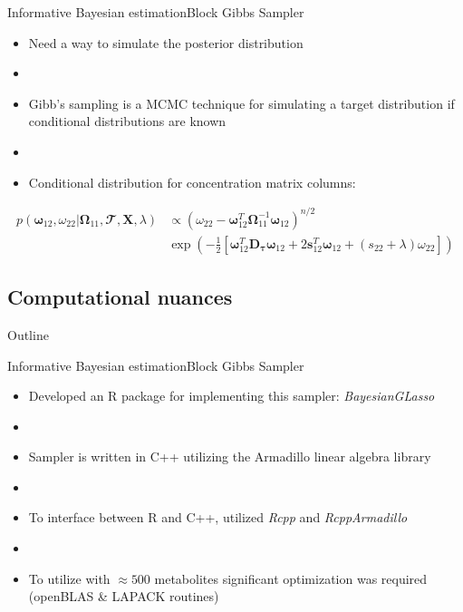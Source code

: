 \documentclass[xcolor=dvipsnames]{beamer}
\begin{document}
\begin{frame}{Informative Bayesian estimation}{Block Gibbs Sampler}
	\vspace{-10.5pt}
	\begin{itemize}
		\item Need a way to simulate the posterior distribution \pause
		\item[]
		\item Gibb's sampling is a MCMC technique for simulating a target distribution if conditional distributions are known \pause
		\item[]
		\item Conditional distribution for concentration matrix columns:
	\end{itemize}
	\begin{align*}
	p(\boldsymbol{\omega}_{12}, \omega_{22}|\boldsymbol{\Omega}_{11},\mathbfcal{T},\textbf{X},\lambda) & \propto \left(\omega_{22}-\boldsymbol{\omega}_{12}^T \boldsymbol{\Omega}_{11}^{-1}\boldsymbol{\omega}_{12} \right)^{n/2} \\ &\exp \left( - \frac{1}{2}\left[ \boldsymbol{\omega}_{12}^T \textbf{D}_{\boldsymbol{\tau}} \boldsymbol{\omega}_{12}+ 2 
	\textbf{s}_{12}^T \boldsymbol{\omega}_{12} + (s_{22}+\lambda)\omega_{22}\right] \right)
	\end{align*}
\end{frame}

\subsection{Computational nuances}
\begin{frame}{Outline}
	\vspace{-10.5pt}
	\tableofcontents[currentsection,subsectionstyle=show/shaded/hide]
\end{frame}
\begin{frame}{Informative Bayesian estimation}{Block Gibbs Sampler}
	\vspace{-15.5pt}
	\begin{itemize}
		\item Developed an R package for implementing this sampler: \emph{BayesianGLasso} \pause
		\item[]
		\item Sampler is written in C++ utilizing the Armadillo linear algebra library \pause
		\item[]
		\item To interface between R and C++, utilized \emph{Rcpp} and \emph{RcppArmadillo} \pause
		\item[]
		\item To utilize with $\approx 500$ metabolites significant optimization was required (openBLAS \& LAPACK routines)
	\end{itemize}
\end{frame}
\end{document}
